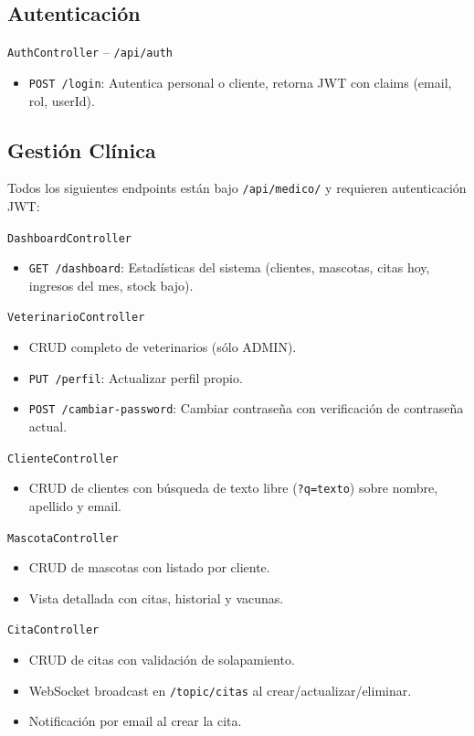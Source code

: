 \subsection{Autenticaci\'on}

\texttt{AuthController} -- \texttt{/api/auth}
\begin{itemize}
    \item \texttt{POST /login}: Autentica personal o cliente, retorna JWT con claims (email, rol, userId).
\end{itemize}

\subsection{Gesti\'on Cl\'inica}

Todos los siguientes endpoints est\'an bajo \texttt{/api/medico/} y requieren autenticaci\'on JWT:

\texttt{DashboardController}
\begin{itemize}
    \item \texttt{GET /dashboard}: Estad\'isticas del sistema (clientes, mascotas, citas hoy, ingresos del mes, stock bajo).
\end{itemize}

\texttt{VeterinarioController}
\begin{itemize}
    \item CRUD completo de veterinarios (s\'olo ADMIN).
    \item \texttt{PUT /perfil}: Actualizar perfil propio.
    \item \texttt{POST /cambiar-password}: Cambiar contrase\~na con verificaci\'on de contrase\~na actual.
\end{itemize}

\texttt{ClienteController}
\begin{itemize}
    \item CRUD de clientes con b\'usqueda de texto libre (\texttt{?q=texto}) sobre nombre, apellido y email.
\end{itemize}

\texttt{MascotaController}
\begin{itemize}
    \item CRUD de mascotas con listado por cliente.
    \item Vista detallada con citas, historial y vacunas.
\end{itemize}

\texttt{CitaController}
\begin{itemize}
    \item CRUD de citas con validaci\'on de solapamiento.
    \item WebSocket broadcast en \texttt{/topic/citas} al crear/actualizar/eliminar.
    \item Notificaci\'on por email al crear la cita.
\end{itemize}

